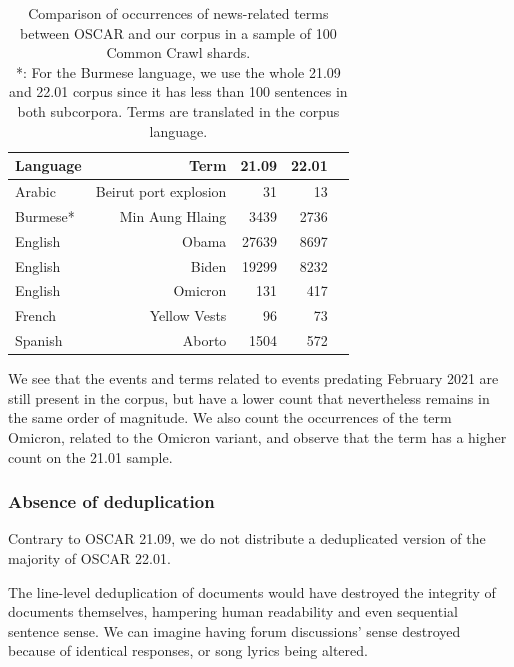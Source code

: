 \begin{table}[t]
    \centering\small
    \begin{tabular}{lrrrr}
        \toprule
        Language                  & Term                  & 21.09 & 22.01 \\
        \midrule
        \multirow{1}{*}{Arabic}   & Beirut port explosion & 31    & 13    \\
        \multirow{1}{*}{Burmese*} & Min Aung Hlaing       & 3439  & 2736  \\
        \multirow{1}{*}{English}  & Obama                 & 27639 & 8697  \\
        \multirow{1}{*}{English}  & Biden                 & 19299 & 8232  \\
        \multirow{1}{*}{English}  & Omicron               & 131   & 417   \\
        \multirow{1}{*}{French}   & Yellow Vests          & 96    & 73    \\
        \multirow{1}{*}{Spanish}  & Aborto                & 1504  & 572   \\
        \bottomrule
    \end{tabular}
    \caption{Comparison of occurrences of news-related terms between OSCAR and our corpus in a sample of 100 Common Crawl shards. \\ *: For the Burmese language, we use the whole 21.09 and 22.01 corpus since it has less than 100 sentences in both subcorpora. Terms are translated in the corpus language.}
    \label{tab:word_frequency_towards}
\end{table}

We see that the events and terms related to events predating February 2021 are still present in the corpus, but have a lower count that nevertheless remains in the same order of magnitude.
We also count the occurrences of the term Omicron, related to the Omicron variant, and observe that the term has a higher count on the 21.01 sample.

\subsubsection{Absence of deduplication}

Contrary to OSCAR 21.09, we do not distribute a deduplicated version of the majority of OSCAR 22.01.

The line-level deduplication of documents would have destroyed the integrity of documents themselves, hampering human readability and even sequential sentence sense. We can imagine having forum discussions' sense destroyed because of identical responses, or song lyrics being altered.

